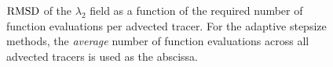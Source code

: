 \begin{figure}[htpb]
    \centering
    
    \caption[$\rmsd$ of the $\lambda_{2}$ field as a function of the required
    number of function evaluations per advected tracer]{
    $\rmsd$ of the $\lambda_{2}$ field as a function of the required number of
    function evaluations per advected tracer. For the adaptive stepsize methods, the \emph{average}
    number of function evaluations across all advected tracers is used as the
    abscissa.}
\label{fig:lmbd2_err_both}
\end{figure}
